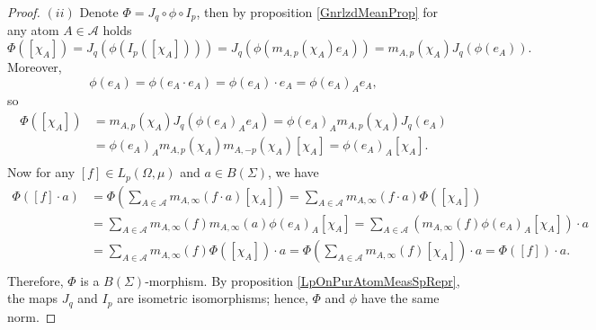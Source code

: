 \documentclass[12pt]{article}
\begin{document}
\begin{proof}
    $(ii)$ Denote $\Phi=J_q\circ \phi\circ I_p$, then by 
    proposition \ref{GnrlzdMeanProp} for any atom $A\in\mathcal{A}$ holds
    \[
        \Phi([\chi_A])
        =J_q(\phi(I_p([\chi_A])))
        =J_q(\phi(m_{A,p}(\chi_A)e_A))
        =m_{A,p}(\chi_A)J_q(\phi(e_A)).
    \]
    Moreover,
    \[
        \phi(e_A)
        =\phi(e_A\cdot e_A)
        =\phi(e_A)\cdot e_A
        =\phi(e_A)_A e_A,
    \]
    so
    \[
    \begin{aligned}
        \Phi([\chi_A])
        &=m_{A,p}(\chi_A)J_q(\phi(e_A)_A e_A) 
        =\phi(e_A)_A m_{A,p}(\chi_A)J_q( e_A) \\
        &=\phi(e_A)_A m_{A,p}(\chi_A)m_{A,-p}(\chi_A) [\chi_A] 
        =\phi(e_A)_A [\chi_A]. \\
    \end{aligned}
    \]
    Now for any $[f]\in L_p(\Omega, \mu)$ and $a\in B(\Sigma)$, we have
    \[
    \begin{aligned}
        \Phi([f]\cdot a)
        &=\Phi\left(
            \sum_{A\in\mathcal{A}} m_{A,\infty}(f\cdot a)[\chi_A]
        \right) 
        =\sum_{A\in\mathcal{A}} m_{A,\infty}(f\cdot a) \Phi([\chi_A]) \\
        &=\sum_{A\in\mathcal{A}} 
            m_{A,\infty}(f) m_{A,\infty}(a) \phi(e_A)_A [\chi_A] 
        =\sum_{A\in\mathcal{A}} 
            (m_{A,\infty}(f) \phi(e_A)_A [\chi_A])\cdot a \\
        &=\sum_{A\in\mathcal{A}} 
            m_{A,\infty}(f) \Phi([\chi_A])\cdot a 
        =\Phi\left(\sum_{A\in\mathcal{A}} 
            m_{A,\infty}(f) [\chi_A]\right)\cdot a 
        =\Phi([f])\cdot a. \\
    \end{aligned}
    \]
    Therefore, $\Phi$ is a $B(\Sigma)$-morphism. By 
    proposition \ref{LpOnPurAtomMeasSpRepr}, the maps $J_q$ and $I_p$ are 
    isometric isomorphisms; hence, $\Phi$ and $\phi$ have the same norm.
\end{proof}
\end{document}
